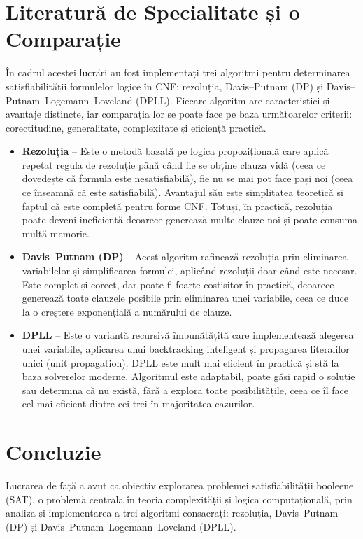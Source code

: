 \documentclass[12pt,a4paper]{article}
\begin{document}
\section{Literatură de Specialitate și o Comparație}
În cadrul acestei lucrări au fost implementați trei algoritmi pentru determinarea satisfiabilității formulelor logice în CNF: rezoluția, Davis–Putnam (DP) și Davis–Putnam–Logemann–Loveland (DPLL). Fiecare algoritm are caracteristici și avantaje distincte, iar comparația lor se poate face pe baza următoarelor criterii: corectitudine, generalitate, complexitate și eficiență practică.
\begin{itemize}
    \item \textbf{Rezoluția} – Este o metodă bazată pe logica propozițională care aplică repetat regula de rezoluție până când fie se obține clauza vidă (ceea ce dovedește că formula este nesatisfiabilă), fie nu se mai pot face pași noi (ceea ce înseamnă că este satisfiabilă). Avantajul său este simplitatea teoretică și faptul că este completă pentru forme CNF. Totuși, în practică, rezoluția poate deveni ineficientă deoarece generează multe clauze noi și poate consuma multă memorie.

    \item \textbf{Davis–Putnam (DP)} – Acest algoritm rafinează rezoluția prin eliminarea variabilelor și simplificarea formulei, aplicând rezoluții doar când este necesar. Este complet și corect, dar poate fi foarte costisitor în practică, deoarece generează toate clauzele posibile prin eliminarea unei variabile, ceea ce duce la o creștere exponențială a numărului de clauze.
    
    \item \textbf{DPLL} – Este o variantă recursivă îmbunătățită care implementează alegerea unei variabile, aplicarea unui backtracking inteligent și propagarea literalilor unici (unit propagation). DPLL este mult mai eficient în practică și stă la baza solverelor moderne. Algoritmul este adaptabil, poate găsi rapid o soluție sau determina că nu există, fără a explora toate posibilitățile, ceea ce îl face cel mai eficient dintre cei trei în majoritatea cazurilor.

\end{itemize}

\section{Concluzie}
Lucrarea de față a avut ca obiectiv explorarea problemei satisfiabilității booleene (SAT), o problemă centrală în teoria complexității și logica computațională, prin analiza și implementarea a trei algoritmi consacrați: rezoluția, Davis–Putnam (DP) și Davis–Putnam–Logemann–Loveland (DPLL).
\end{document}
